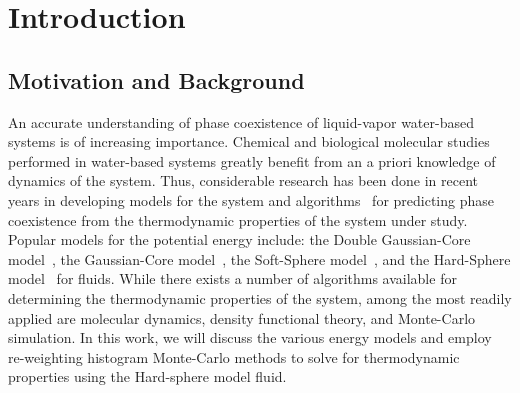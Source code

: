 \documentclass[letterpaper,twocolumn,amsmath,amssymb,pre,aps,10pt]{revtex4-1}
\begin{document}




\section{Introduction}

\subsection{Motivation and Background}

An accurate understanding of phase coexistence of liquid-vapor water-based systems is of increasing importance.  Chemical and biological molecular studies performed in water-based systems greatly benefit from an a priori knowledge of dynamics of the system.  Thus, considerable research has been done in recent years in developing models for the system and algorithms~\cite{wang1999transition, wang2002transition, swendsen1999transition, Broadhistogram, trebst2004optimizing, wessel2007optimized} for predicting phase coexistence from the thermodynamic properties of the system under study.  Popular models for the potential energy include:  the Double Gaussian-Core model~\cite{speranza2014phase, prestipino2014twofold}, the Gaussian-Core model~\cite{rane2013monte, krekelberg2009anomalous, mausbach2009solid}, the Soft-Sphere model~\cite{kreitzberg2015monte, torrie1977nonphysical}, and the Hard-Sphere model~\cite{hughes2013classical, lurie2014approach, krebs2014improved, schulte2015thesis, perlin2015thesis} for fluids.  While there exists a number of algorithms available for determining the thermodynamic properties of the system, among the most readily applied are molecular dynamics, density functional theory, and Monte-Carlo simulation.  In this work, we will discuss the various energy models and employ re-weighting histogram Monte-Carlo methods to solve for thermodynamic properties using the Hard-sphere model fluid.  
 
\end{document}
